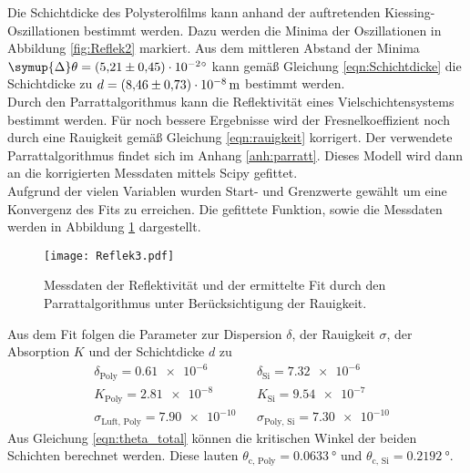 Die Schichtdicke des Polysterolfilms kann anhand der auftretenden Kiessing-Oszillationen bestimmt werden. Dazu werden die Minima der Oszillationen in Abbildung \ref{fig:Reflek2}
markiert. Aus dem mittleren Abstand der Minima $\symup{\Delta}\theta = \qty{5.21 +- 0.45e-2}{\degree}$ kann gemäß Gleichung \ref{eqn:Schichtdicke} die Schichtdicke zu 
$d = \qty{8.46 +- 0.73e-8}{\metre}$ bestimmt werden.\\
Durch den Parrattalgorithmus kann die Reflektivität eines Vielschichtensystems bestimmt werden. Für noch bessere Ergebnisse wird der Fresnelkoeffizient noch durch eine 
Rauigkeit gemäß Gleichung \ref{eqn:rauigkeit} korrigert. Der verwendete Parrattalgorithmus findet sich im Anhang \ref{anh:parratt}. Dieses Modell wird dann an die korrigierten
Messdaten mittels Scipy \cite{scipy} gefittet.\\
Aufgrund der vielen Variablen wurden Start- und Grenzwerte gewählt um eine Konvergenz des Fits 
zu erreichen. Die gefittete Funktion, sowie die Messdaten werden in Abbildung \ref{fig:Reflek3} dargestellt.
\begin{figure}
    \centering
    \texttt{[image: Reflek3.pdf]}
    \caption{Messdaten der Reflektivität und der ermittelte Fit durch den Parrattalgorithmus unter Berücksichtigung der Rauigkeit.}
    \label{fig:Reflek3}
\end{figure}
Aus dem Fit folgen die Parameter zur Dispersion $\delta$, der Rauigkeit $\sigma$, der Absorption $K$ und der Schichtdicke $d$ zu
\begin{align*}
    &\delta_\text{Poly} = \num{0.61e-6} & &\delta_\text{Si} = \num{7.32e-6} \\
    &K_\text{Poly} = \num{2.81e-8} & &K_\text{Si} = \num{9.54e-7} \\
    &\sigma_\text{Luft, Poly} = \num{7.90e-10} & &\sigma_\text{Poly, Si} = \num{7.30e-10}
  \end{align*}
Aus Gleichung \ref{eqn:theta_total} können die kritischen Winkel der beiden Schichten berechnet werden. Diese lauten $\theta_\text{c, Poly} = \qty{0.0633}{\degree}$ und $\theta_\text{c, Si} = \qty{0.2192}{\degree}$.